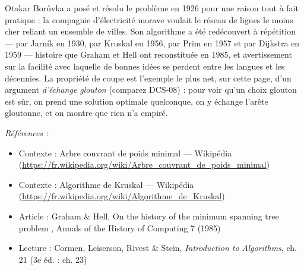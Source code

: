 \documentclass[11pt]{article}
\newenvironment{refs}{\par\small\noindent\emph{Références :}\begin{itemize}\setlength\itemsep{0pt}}{\end{itemize}\normalsize}
\begin{document}
\noindent Otakar Bor\r{u}vka a posé et résolu le problème en 1926 pour une raison tout à fait pratique : la compagnie d'électricité morave voulait le réseau de lignes le moins cher reliant un ensemble de villes. Son algorithme a été redécouvert à répétition --- par Jarník en 1930, par Kruskal en 1956, par Prim en 1957 et par Dijkstra en 1959 --- histoire que Graham et Hell ont reconstituée en 1985, et avertissement sur la facilité avec laquelle de bonnes idées se perdent entre les langues et les décennies. La propriété de coupe est l'exemple le plus net, sur cette page, d'un argument \textit{d'échange glouton} (comparez DCS-08) : pour voir qu'un choix glouton est sûr, on prend une solution optimale quelconque, on y échange l'arête gloutonne, et on montre que rien n'a empiré.

\begin{refs}
\item Contexte : Arbre couvrant de poids minimal --- Wikipédia (\url{https://fr.wikipedia.org/wiki/Arbre_couvrant_de_poids_minimal})
\item Contexte : Algorithme de Kruskal --- Wikipédia (\url{https://fr.wikipedia.org/wiki/Algorithme_de_Kruskal})
\item Article : Graham \& Hell, \og{} On the history of the minimum spanning tree problem \fg{}, Annals of the History of Computing 7 (1985)
\item Lecture : Cormen, Leiserson, Rivest \& Stein, \textit{Introduction to Algorithms}, ch. 21 (3e éd. : ch. 23)
\end{refs}

\bigskip
\end{document}
